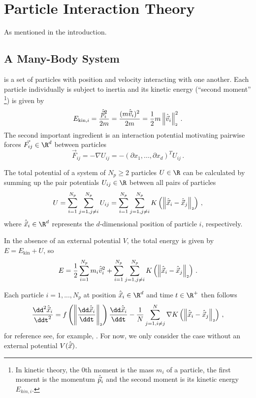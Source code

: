 \chapter{Particle Interaction Theory}
\label{chap:particle-interaction-theory}

As mentioned in the introduction.

\section{A Many-Body System}
is a set of particles with position and velocity interacting with one another.
Each particle individually is subject to inertia and its kinetic energy (``second moment'' \footnote{
  In kinetic theory, the $0$th moment is the mass $m_i$ of a particle, the first moment is the momentum $\hat{\vec{p}}_i$ and the second moment is its kinetic energy $E_{kin,i}$.
}) is given by
$$E_{\text{kin},i} = \frac{\hat{\vec{p}}_i^2}{2m} = \frac{(m \hat{\vec{v}}_i)^2}{2m} = \frac{1}{2} m \left\lVert\hat{\vec{v}}_i\right\rVert_{\scriptscriptstyle 2}^2\,.$$
The second important ingredient is an interaction potential motivating pairwise forces $\vec{F_{ij}} \in \R^d$ between particles
$$\vec{F}_{ij} = -\nabla U_{ij} = -\left(\partial x_1, ..., \partial x_d\right)^T U_{ij}\,.$$

The total potential of a system of $N_p \ge 2$ particles $U \in \R$ can be calculated by summing up the pair potentials $U_{ij} \in \R$ between all pairs of particles
$$U = \sum_{i=1}^{N_p}\sum_{j=1, j \neq i}^{N_p} U_{ij} = \sum_{i=1}^{N_p}\sum_{j=1, j \neq i}^{N_p} K\left(\left\lVert\hat{\vec{x}}_i - \hat{\vec{x}}_j\right\rVert_{\scriptscriptstyle 2}\right)\,,$$
where $\hatvec{x}_i \in \R^d$ represents the $d$-dimensional position of particle $i$, respectively.

In the absence of an external potential $V$, the total energy is given by $E = E_{\text{kin}} + U$, so
\begin{equation}
  E = \frac{1}{2} \sum_{i=1}^{N_p} m_i \hat{\vec{v}}_i^2 + \sum_{i=1}^{N_p}\sum_{j=1, j \neq i}^{N_p} K\left(\left\lVert\hat{\vec{x}}_i - \hat{\vec{x}}_j\right\rVert_{\scriptscriptstyle 2}\right)\,.
  \label{eq:total-energy}
\end{equation}

Each particle $i=1, ..., N_p$ at position $\hatvec{x}_i \in \R^d$ and time $t \in \R^+$ then follows
\begin{equation}
  \frac{\dd^2 \hatvec{x}_i}{\ddt^2} = f\left(\norm{\frac{\dd \hatvec{x}_i}{\ddt}}\right) \frac{\dd\hatvec{x}_i}{\ddt} - \frac{1}{N} \sum_{j=1, i\neq j}^{N} \nabla K\left(\norm{\hatvec{x}_i - \hatvec{x}_j}\right)\,,
  \label{eq:evolution-equation}
\end{equation}
for reference see, for example, \parencite{2020-power-law-kernels, 2021-arbitrary-dimensions}.
For now, we only consider the case without an external potential $V(\hat{\vec{x}})$.


